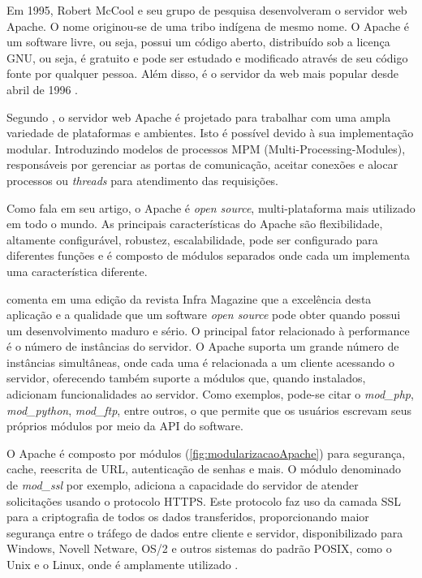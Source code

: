 Em 1995, Robert McCool e seu grupo de pesquisa desenvolveram o servidor web Apache. O nome originou-se de uma tribo indígena de mesmo nome. O Apache é um software livre, ou seja, possui um código aberto, distribuído sob a licença GNU, ou seja, é gratuito e pode ser estudado e modificado através de seu código fonte por qualquer pessoa. Além disso, é o servidor da web mais popular desde abril de 1996 \cite{netcraft}.

Segundo , o servidor web Apache é projetado para trabalhar com uma ampla variedade de plataformas e ambientes. Isto é possível devido à sua implementação  modular. Introduzindo modelos de processos MPM (Multi-Processing-Modules), responsáveis por gerenciar as portas de comunicação, aceitar conexões e alocar processos ou \textit{threads} para atendimento das requisições.

Como  fala em seu artigo, o Apache é \textit{open source}, multi-plataforma mais utilizado em todo o mundo. As principais características do Apache são flexibilidade, altamente configurável, robustez, escalabilidade, pode ser configurado para diferentes funções e é composto de módulos separados onde cada um implementa uma característica diferente.

 comenta em uma edição da revista Infra Magazine que a excelência desta aplicação e a qualidade que um software \textit{open source} pode obter quando possui um desenvolvimento maduro e sério. O principal fator relacionado à performance é o número de instâncias do servidor. O Apache suporta um grande número de instâncias simultâneas, onde cada uma é relacionada a um cliente acessando o servidor, oferecendo também suporte a módulos que, quando instalados, adicionam funcionalidades ao servidor. Como exemplos, pode-se citar o \textit{mod\_php}, \textit{mod\_python}, \textit{mod\_ftp}, entre outros, o que permite que os usuários escrevam seus próprios módulos por meio da API do software.

O Apache é composto por módulos (\autoref{fig:modularizacaoApache}) para segurança, cache, reescrita de URL, autenticação de senhas e mais. O módulo denominado de \textit{mod\_ssl} por exemplo, adiciona a capacidade do servidor de atender solicitações usando o protocolo HTTPS. Este protocolo faz uso da camada SSL para a criptografia de todos os dados transferidos, proporcionando maior segurança entre o tráfego de dados entre cliente e servidor,  disponibilizado para Windows, Novell Netware, OS/2 e outros sistemas do padrão POSIX, como o Unix e o Linux, onde é amplamente utilizado \cite{apache:magazine}.

